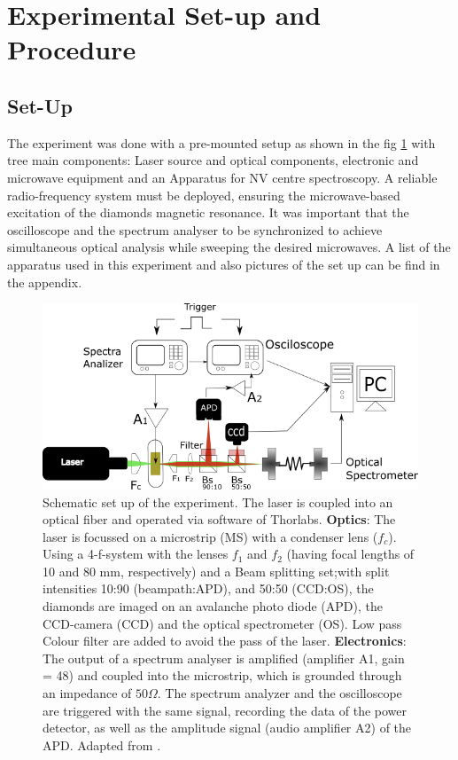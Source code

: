 \section{Experimental Set-up and Procedure}
\subsection{Set-Up}

The experiment was done with a pre-mounted setup as shown in the fig \ref{fig:setup1} with tree main components: Laser source and optical components, electronic and microwave equipment and an Apparatus for NV centre spectroscopy. A reliable radio-frequency system must be deployed, ensuring the microwave-based excitation of the diamonds magnetic resonance. It was important that the oscilloscope and the spectrum analyser to be synchronized to achieve simultaneous optical analysis while sweeping the desired microwaves. A list of the apparatus used in this experiment and also pictures of the set up can be find in the appendix.

\begin{figure}[hb]
	\centering
	\includegraphics[width=0.7\linewidth]{../figures/setup1}
	\caption[Schematic set up of the experiment]{Schematic set up of the experiment. The laser is coupled into an optical fiber and operated via software of Thorlabs. \textbf{Optics}: The laser is focussed on a microstrip (MS) with a condenser lens ($f_c$). Using a 4-f-system with the lenses $f_1$ and $f_2$ (having focal lengths of 10 and 80 mm, respectively) and a Beam splitting set;with split intensities 10:90 (beampath:APD), and 50:50 (CCD:OS), the diamonds are imaged on an avalanche photo diode (APD), the CCD-camera (CCD) and the optical spectrometer (OS). Low pass Colour filter are added to avoid the pass of the laser.
	\textbf{Electronics}: The output of a spectrum analyser is amplified (amplifier A1, gain = 48) and coupled into the microstrip, which is grounded through an impedance of $50\Omega$.
	The spectrum analyzer and the oscilloscope are triggered with the same signal, recording the data of the power detector, as well as the amplitude signal (audio amplifier A2) of the APD.  Adapted from \cite{anleitung}.}
	\label{fig:setup1}
\end{figure}

